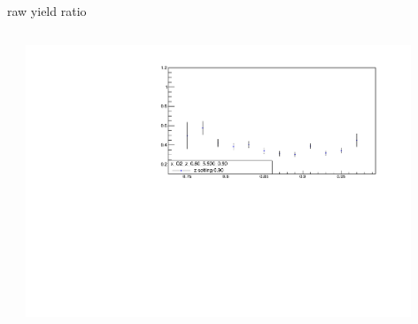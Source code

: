 \begin{frame}{raw yield ratio}
\begin{columns}
\begin{column}[T]{0.5\textwidth}
\end{column}
\begin{column}[T]{0.5\textwidth}
\includegraphics[width = 0.9\textwidth]{results/yield/statistics/x_Q2_z_0.60_5.500_0.90_ratio.pdf}
\end{column}
\end{columns}
\end{frame}
